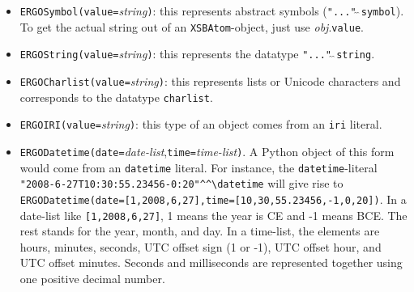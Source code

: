 \begin{itemize}
\item  \texttt{ERGOSymbol(value=}\emph{string}\texttt{)}: this represents
  \ERGO abstract symbols (\texttt{"..."$\hat{~}\hat{~}$\bs{}symbol}). To get
  the actual string out of an
  \texttt{XSBAtom}-object, just use \emph{obj}.\texttt{value}.      
\item  \texttt{ERGOString(value=}\emph{string}\texttt{)}: this represents
  the \ERGO datatype \texttt{"..."$\hat{~}\hat{~}$\bs{}string}.
\item  \texttt{ERGOCharlist(value=}\emph{string}\texttt{)}: this represents
  lists or Unicode characters and corresponds to the
  \ERGO datatype \texttt{\bs{}charlist}.
\item \texttt{ERGOIRI(value=}\emph{string}\texttt{)}: this type of an
  object comes from an \ERGO \texttt{\bs{}iri} literal.
\item
  \texttt{ERGODatetime(date=}\emph{date-list},\texttt{time=}\emph{time-list}\texttt{)}. A
  Python object of this form would come from an \ERGO
  \texttt{\bs{}datetime} literal.  For instance,
  the \ERGO \texttt{\bs{}datetime}-literal
  \verb|"2008-6-27T10:30:55.23456-0:20"^^\datetime| will give rise to
  \texttt{ERGODatetime(date=[1,2008,6,27],time=[10,30,55.23456,-1,0,20])}.
  In a date-list like \texttt{[1,2008,6,27]}, 1 means the year is CE and -1
  means BCE. The rest stands for the year, month, and day. In a time-list,
  the elements are hours, minutes, seconds, UTC offset sign (1 or -1), UTC
  offset hour, and UTC offset minutes. Seconds and milliseconds are
  represented together using one positive decimal number.


\end{itemize}
